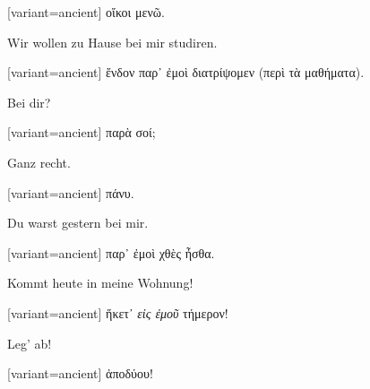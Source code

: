 \begin{greek}[variant=ancient]%
οἴκοι μενῶ.

\end{greek}%
\switchcolumn*

Wir wollen zu Hause bei mir studiren.

\switchcolumn

\begin{greek}[variant=ancient]%
ἔνδον παρ᾽ ἐμοὶ διατρίψομεν (περὶ τὰ μαθήματα).

\end{greek}%
\switchcolumn*

Bei dir?

\switchcolumn

\begin{greek}[variant=ancient]%
παρὰ σοί;

\end{greek}%
\switchcolumn*

Ganz recht.

\switchcolumn

\begin{greek}[variant=ancient]%
πάνυ.

\end{greek}%
\switchcolumn*

Du warst gestern bei mir.

\switchcolumn

\begin{greek}[variant=ancient]%
παρ᾽ ἐμοὶ χθὲς ἦσθα.

\end{greek}%
\switchcolumn*

Kommt heute in meine Wohnung!

\switchcolumn

\begin{greek}[variant=ancient]%
ἥκετ᾽ \emph{εἰς ἐμοῦ} τήμερον!

\end{greek}%
Leg' ab!

\switchcolumn

\begin{greek}[variant=ancient]%
ἀποδύου!

\end{greek}%
\switchcolumn*


